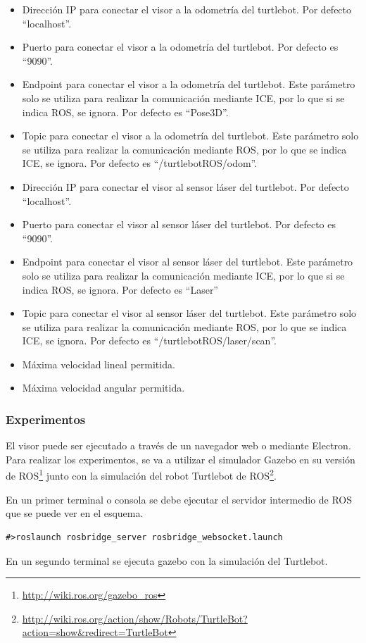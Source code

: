 \begin{itemize}
\item Dirección IP para conectar el visor a la odometría del turtlebot. Por defecto ``localhost''.
\item Puerto para conectar el visor a la odometría del turtlebot. Por defecto es ``9090''.
\item Endpoint para conectar el visor a la odometría del turtlebot. Este parámetro solo se utiliza para realizar la comunicación mediante ICE, por lo que si se indica ROS, se ignora. Por defecto es ``Pose3D''.
\item Topic para conectar el visor a la odometría del turtlebot. Este parámetro solo se utiliza para realizar la comunicación mediante ROS, por lo que se indica ICE, se ignora. Por defecto es ``/turtlebotROS/odom''.
\item Dirección IP para conectar el visor al sensor láser del turtlebot. Por defecto ``localhost''.
\item Puerto para conectar el visor al sensor láser del turtlebot. Por defecto es ``9090''.
\item Endpoint para conectar el visor al sensor láser del turtlebot. Este parámetro solo se utiliza para realizar la comunicación mediante ICE, por lo que si se indica ROS, se ignora. Por defecto es ``Laser''
\item Topic para conectar el visor al sensor láser del turtlebot. Este parámetro solo se utiliza para realizar la comunicación mediante ROS, por lo que se indica ICE, se ignora. Por defecto es ``/turtlebotROS/laser/scan''.
\item Máxima velocidad lineal permitida.
\item Máxima velocidad angular permitida.
\end{itemize}

\subsubsection{Experimentos}
El visor puede ser ejecutado a través de un navegador web o mediante Electron. Para realizar los experimentos, se va a utilizar el simulador Gazebo en su versión de ROS\footnote{\url{http://wiki.ros.org/gazebo_ros}} junto con la simulación del robot Turtlebot de ROS\footnote{\url{http://wiki.ros.org/action/show/Robots/TurtleBot?action=show&redirect=TurtleBot}}.

En un primer terminal o consola se debe ejecutar el servidor intermedio de ROS que se puede ver en el esquema.
\begin{lstlisting}[caption= Ejecución del servidor intermedio, label=cod.servidorintermedioturtlebot]
#>roslaunch rosbridge_server rosbridge_websocket.launch
\end{lstlisting}
En un segundo terminal se ejecuta gazebo con la simulación del Turtlebot.

